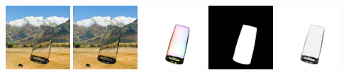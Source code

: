     \\
    \includegraphics[width=0.18\textwidth]{ch-tomnet/images/Synth/synthetic_179_shap0000_COCO_val2014_000000478055_tar.jpg}
    \includegraphics[width=0.18\textwidth]{ch-tomnet/images/Synth/synthetic_179_shap0000_COCO_val2014_000000478055_pred.jpg}
    \includegraphics[width=0.18\textwidth]{ch-tomnet/images/Synth/synthetic_179_shap000478055_gt_fcolor.jpg}
    \includegraphics[width=0.18\textwidth]{ch-tomnet/images/Synth/synthetic_179_shap0000_COCO_val2014_000000478055_gt_mask}
    \includegraphics[width=0.18\textwidth]{ch-tomnet/images/Synth/synthetic_179_shap0000_COCO_val2014_000000478055_gt_rho}
